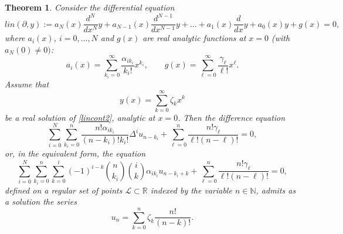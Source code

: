 \documentclass[10pt]{amsart}
\numberwithin{equation}{section}
\newtheorem{theorem}{Theorem}
\theoremstyle{definition}
\begin{document}
\begin{theorem}
\label{main1}
 Consider the differential equation
\begin{equation}
lin(\partial , y):=a_{N}(x) \frac{d^{N}}{dx^{N}}y + a_{N-1}(x)
\frac{d^{N-1}}{dx^{N-1}}y +\ldots +a_{1}(x) \frac{d}{dx} y+a_{0}(x) y +g(x)=0,
\label{lincont2}
\end{equation}
where $a_{i}(x)$, $i=0,\ldots ,N$ and $g(x)$ are real analytic functions at
$x=0$ (with $a_{N}(0)\neq 0)$:
\begin{equation}
a_{i}(x)=\sum _{k_{i}=0}^{\infty}\frac{\alpha _{ik_{i}}}{k_{i}!}x^{k_{i}},
\qquad g(x)=\sum _{\ell =0}^{\infty}\frac{\gamma _{\ell}}{\ell !}x^{
\ell}.
\label{eq5.2}
\end{equation}
Assume that
\begin{equation}
\label{eq:23}
y(x)=\sum _{k=0}^{\infty} \zeta _{k} x^{k}
\end{equation}
be a real solution of  \eqref{lincont2}, analytic at $x=0$. Then the difference
equation
\begin{equation}
\label{eqlin}
\sum _{i=0}^{N} \sum _{k_{i}=0}^{n}
\frac{n!\alpha _{ik_{i}}}{(n-k_{i})!k_{i}!}\Delta ^{i}u_{n-k_{i}} +
\sum _{\ell =0}^{n} \frac{n! \gamma _{\ell}} {\ell ! (n-\ell )!} =0,
\end{equation}
or, in the equivalent form, the equation
\begin{equation}
\label{eqlin2}
\sum _{i=0}^{N} \sum _{k_{i}=0}^{n} \sum _{k=0}^{i} (-1)^{i-k}
\binom{n}{k_{i}}\binom{i}{k}\alpha _{ik_{i}}u_{n-k_{i}+k} +\sum _{
\ell =0}^{n} \frac{n! \gamma _{\ell}} {\ell ! (n-\ell )!} =0,
\end{equation}
defined on a regular set of points $\mathcal{L}\subset \mathbb{R}$ indexed
by the variable $n\in \mathbb{N}$, admits as a solution the series
\begin{equation}
u_{n}=\sum _{k=0}^{n} \zeta _{k} \frac{n!}{(n-k)!}.
\label{part1}
\end{equation}
\end{theorem}
\end{document}
